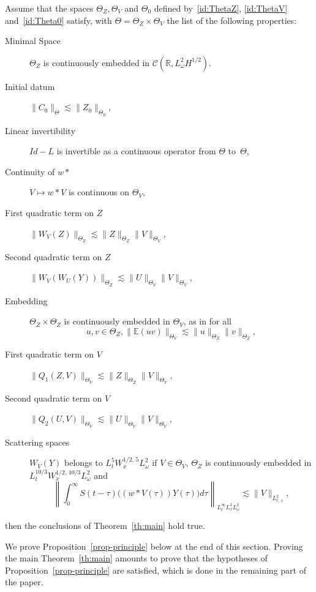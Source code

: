 \documentclass[AHL, Unicode, longabstracts,published]{cedram}
\newcommand{\R}{\mathbb{R}}
\newcommand{\E}{\mathbb{E}}
\newcommand{\mclC}{\mathcal{C}}
\begin{document}
\begin{prop}\label{prop-principle}
Assume that the spaces $\Theta_Z, \Theta_V$ and $\Theta_0$ defined by~\eqref{id:ThetaZ}, \eqref{id:ThetaV} and~\eqref{id:Theta0} satisfy, with $\Theta = \Theta_Z \times \Theta_V$ the list of the following properties:
\begin{description}
\item[Minimal Space]\label{prop3.1.1} $\Theta_Z$ is continuously embedded in $\mclC (\R, L^2_\omega H^{1/2}) $.
\item[Initial datum]\label{prop3.1.2} $\|C_0\|_\Theta \lesssim \|Z_0\|_{\Theta_0}$,
\item[Linear invertibility]\label{prop3.1.3} $Id-L$ is invertible as a continuous operator from $\Theta$ to~$\Theta$,
\item[Continuity of $w*$]\label{prop3.1.4} $V\mapsto w* V$ is continuous on $\Theta_V$,
\item[First quadratic term on $Z$]\label{prop3.1.5} $\|W_V(Z)\|_{\Theta_Z} \lesssim \|Z\|_{\Theta_Z} \|V\|_{\Theta_V}$,
\item[Second quadratic term on $Z$]\label{prop3.1.6} $\|W_V(W_U(Y))\|_{\Theta_Z} \lesssim \|U\|_{\Theta_V} \|V\|_{\Theta_V}$,
\item[Embedding]\label{prop3.1.7} $\Theta_Z \times \Theta_Z$ is continuously embedded in $\Theta_V$, as in for all
\[
u,v \in \Theta_Z, \|\E(uv)\|_{\Theta_V} \lesssim \|u\|_{\Theta_Z} \|v\|_{\Theta_Z},
\]
\item[First quadratic term on $V$]\label{prop3.1.8} $\|Q_1(Z,V)\|_{\Theta_V} \lesssim \|Z\|_{\Theta_Z} \|V\|_{\Theta_V}$,
\item[Second quadratic term on $V$]\label{prop3.1.9} $
 \|Q_2(U,V) \|_{\Theta_V} \lesssim \|U\|_{\Theta_V} \|V\|_{\Theta_V}, $
\item[Scattering spaces]\label{prop3.1.10} $W_V(Y)$ belongs to $L^5_t W^{1/2,\,5}_xL^2_\omega$ if $V\in \Theta_V$, $\Theta_Z$ is continuously embedded in $L^{10/3}_t W^{1/2,\,10/3}_x L^2_\omega$ and
\[
\left\|\int_{0}^\infty S(t-\tau) \Big((w*V(\tau)) Y(\tau) \Big)d\tau\right\|_{L^{\infty}_tL^3_x L^2_\omega} \lesssim \|V\|_{L^2_{t,\,x}},
\]
\end{description}
then the conclusions of Theorem~\ref{th:main} hold true.
\end{prop}



We prove Proposition~\ref{prop-principle} below at the end of this section. Proving the main Theorem~\ref{th:main} amounts to prove that the hypotheses of Proposition~\ref{prop-principle} are satisfied, which is done in the remaining part of the paper.
\end{document}
